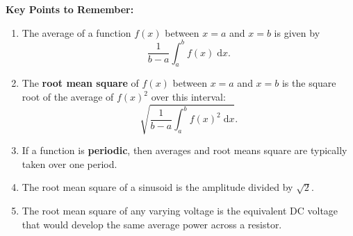 \documentclass{article}
\newcommand{\diff}{\;\mathrm{d}}
\begin{document}
\clearpage





{\bf Key Points to Remember:}

\vspace{5mm}

\begin{enumerate}
	\item The average of a function $f(x)$ between $x=a$ and $x=b$ is given by
		\[\frac{1}{b-a}\int_a^b f(x)\diff x.\]
	\item The \textbf{root mean square} of $f(x)$ between $x=a$ and $x=b$ is the square root of the average of $f(x)^2$ over this interval:
		\[\sqrt{\frac{1}{b-a}\int_a^b f(x)^2\diff x}.\]
	\item If a function is \textbf{periodic}, then averages and root means square are typically taken over one period.
	\item The root mean square of a sinusoid is the amplitude divided by $\sqrt{2}$.
	\item The root mean square of any varying voltage is the equivalent DC voltage that would develop the same average power across a resistor.
\end{enumerate}
\end{document}
